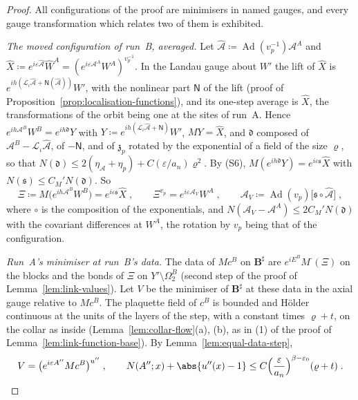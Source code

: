 \begin{proof}
All configurations of the proof are minimisers in named gauges, and every gauge transformation which relates two of them is exhibited.

\emph{The moved configuration of run~B, averaged.} Let $\hat{\mathcal A} \coloneqq \operatorname{Ad}(v_p^{-1})\mathcal A^A$ and $\hat X \coloneqq e^{i\varepsilon\hat{\mathcal A}}\hat W^A = (e^{i\varepsilon\mathcal A^A}W^A)^{v_p^{-1}}$. In the Landau gauge about $W'$ the lift of $\hat X$ is $e^{ih(\mathcal L_\iota\hat{\mathcal A} + \mathsf N(\hat{\mathcal A}))}W'$, with the nonlinear part $\mathsf N$ of the lift (proof of Proposition~\ref{prop:localisation-functions}), and its one-step average is $\hat X$, the transformations of the orbit being one at the sites of run~A. Hence $e^{ih\mathcal A^B}W^B = e^{ih\mathfrak d}Y$ with $Y \coloneqq e^{ih(\mathcal L_\iota\hat{\mathcal A} + \mathsf N)}W'$, $MY = \hat X$, and $\mathfrak d$ composed of $\mathcal A^B - \mathcal L_\iota\hat{\mathcal A}$, of $-\mathsf N$, and of $\mathfrak z_p$ rotated by the exponential of a field of the size $\varrho$, so that $N(\mathfrak d) \leq 2(\eta_{\mathcal A} + \eta_p) + C(\varepsilon/a_n)\varrho^2$. By (S6), $M(e^{ih\mathfrak d}Y) = e^{i\varepsilon\mathfrak s}\hat X$ with $N(\mathfrak s) \leq C_M'N(\mathfrak d)$. So
\[
    \Xi \coloneqq M\bigl(e^{ih\mathcal A^B}W^B\bigr) = e^{i\varepsilon\mathfrak s}\hat X\;,
    \qquad
    \Xi^{v_p} = e^{i\varepsilon\mathcal A_V}W^A\;,
    \qquad
    \mathcal A_V \coloneqq \operatorname{Ad}(v_p)\bigl[\mathfrak s \circ \hat{\mathcal A}\bigr]\;,
\]
where $\circ$ is the composition of the exponentials, and $N(\mathcal A_V - \mathcal A^A) \leq 2C_M'N(\mathfrak d)$ with the covariant differences at $W^A$, the rotation by $v_p$ being that of the configuration.

\emph{Run~A's minimiser at run~B's data.} The data of $Mc^B$ on $\mathbf B^\sharp$ are $e^{iE^B}M^\cdot(\Xi)$ on the blocks and the bonds of $\Xi$ on $Y' \setminus \Omega^B_2$ (second step of the proof of Lemma~\ref{lem:link-values}). Let $V$ be the minimiser of $\mathbf B^\sharp$ at these data in the axial gauge relative to $Mc^B$. The plaquette field of $c^B$ is bounded and H\"older continuous at the units of the layers of the step, with a constant times $\varrho + t$, on the collar as inside (Lemma~\ref{lem:collar-flow}(a), (b), as in (1) of the proof of Lemma~\ref{lem:link-function-base}). By Lemma~\ref{lem:equal-data-step},
\[
    V = \bigl(e^{i\varepsilon A''}Mc^B\bigr)^{u''}\;,
    \qquad
    N(A''; x) + \abs{u''(x) - 1} \leq C\Bigl(\frac{\varepsilon}{a_n}\Bigr)^{\beta-\varepsilon_0}(\varrho + t)\;.
\]


\end{proof}
